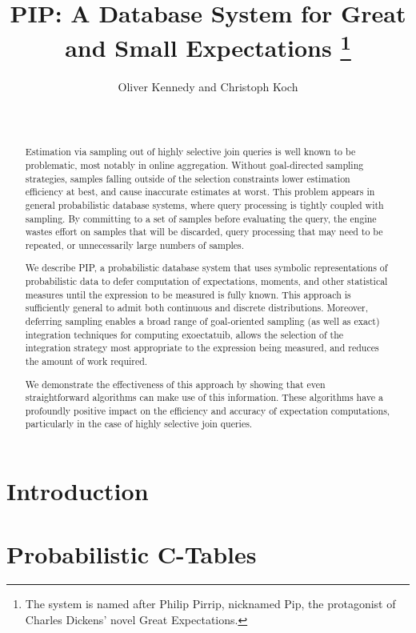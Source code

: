\documentclass{vldb}
\title{PIP: A Database System for Great and Small Expectations%
\thanks{The
system is named after Philip Pirrip, nicknamed Pip, the protagonist of
Charles Dickens' novel Great Expectations.}}
\author{\alignauthor Oliver Kennedy and Christoph Koch\\
\affaddr{Department of Computer Science} \\
\affaddr{Cornell University, Ithaca, NY, USA} \\
\email{\{okennedy, koch\}@cs.cornell.edu}}
\date{}
\begin{document}


\maketitle



\begin{abstract}
Estimation via sampling out of highly selective join queries is well known to be problematic, most notably in online aggregation.  Without goal-directed sampling strategies, samples falling outside of the selection constraints lower estimation efficiency at best, and cause inaccurate estimates at worst.  This problem appears in general probabilistic database systems, where query processing is tightly coupled with sampling.  By committing to a set of samples before evaluating the query, the engine wastes effort on samples that will be discarded, query processing that may need to be repeated, or unnecessarily large numbers of samples.  

We describe PIP, a probabilistic database system that uses symbolic representations of probabilistic data to defer computation of expectations, moments, and other statistical measures until the expression to be measured is fully known.  This approach is sufficiently general to admit both continuous and discrete distributions.  Moreover, deferring sampling enables a broad range of goal-oriented sampling (as well as exact) integration techniques for computing exoectatuib, allows the selection of the integration strategy most appropriate to the expression being measured, and reduces the amount of work required.  

We demonstrate the effectiveness of this approach by showing that even straightforward algorithms can make use of this information.  These algorithms have a profoundly positive impact on the efficiency and accuracy of expectation computations, particularly in the case of highly selective join queries.
\end{abstract}



\section{Introduction}
\label{sec:introduction}


\section{Probabilistic C-Tables}
\label{sec:background}

\end{document}
